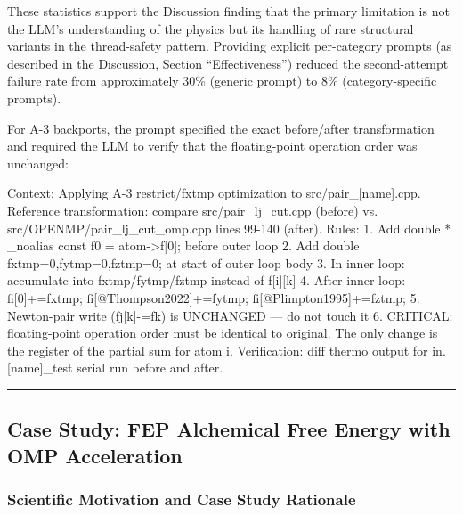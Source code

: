 \documentclass[
  11pt,
]{article}
\newenvironment{Shaded}{}{}
\newcommand{\NormalTok}[1]{#1}
\begin{document}
These statistics support the Discussion finding that the primary
limitation is not the LLM's understanding of the physics but its
handling of rare structural variants in the thread-safety pattern.
Providing explicit per-category prompts (as described in the Discussion,
Section ``Effectiveness'') reduced the second-attempt failure rate from
approximately 30\% (generic prompt) to 8\% (category-specific prompts).

For A-3 backports, the prompt specified the exact before/after
transformation and required the LLM to verify that the floating-point
operation order was unchanged:

\begin{Shaded}
\begin{Highlighting}[]
\NormalTok{Context: Applying A{-}3 restrict/fxtmp optimization to src/pair\_[name].cpp.}
\NormalTok{Reference transformation: compare src/pair\_lj\_cut.cpp (before) vs.}
\NormalTok{                          src/OPENMP/pair\_lj\_cut\_omp.cpp lines 99{-}140 (after).}
\NormalTok{Rules:}
\NormalTok{  1. Add  double * \_noalias const f0 = atom{-}\textgreater{}f[0];  before outer loop}
\NormalTok{  2. Add  double fxtmp=0,fytmp=0,fztmp=0;  at start of outer loop body}
\NormalTok{  3. In inner loop: accumulate into fxtmp/fytmp/fztmp instead of f[i][k]}
\NormalTok{  4. After inner loop: fi[0]+=fxtmp; fi[@Thompson2022]+=fytmp; fi[@Plimpton1995]+=fztmp;}
\NormalTok{  5. Newton{-}pair write (fj[k]{-}=fk) is UNCHANGED — do not touch it}
\NormalTok{  6. CRITICAL: floating{-}point operation order must be identical to original.}
\NormalTok{              The only change is the register of the partial sum for atom i.}
\NormalTok{Verification: diff thermo output for in.[name]\_test serial run before and after.}
\end{Highlighting}
\end{Shaded}

\begin{center}\rule{0.5\linewidth}{0.5pt}\end{center}

\subsection{Case Study: FEP Alchemical Free Energy with OMP
Acceleration}\label{case-study-fep-alchemical-free-energy-with-omp-acceleration}

\subsubsection{Scientific Motivation and Case Study
Rationale}\label{scientific-motivation-and-case-study-rationale}
\end{document}
